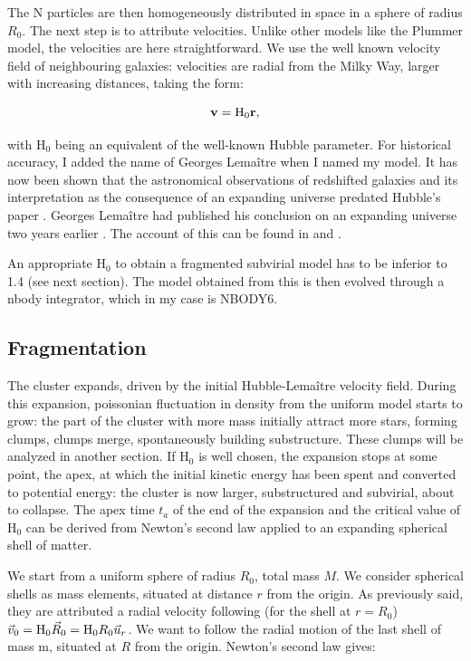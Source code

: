 The N particles are then homogeneously distributed in space in a sphere of radius $R_0$. The next step is to attribute velocities. Unlike other models like the Plummer model, the velocities are here straightforward. We use the well known velocity field of neighbouring galaxies: velocities are radial from the Milky Way, larger with increasing distances, taking the form:

\begin{equation}
\label{Eq:1_Hubble}
\bold{v} =  \textrm{H}_0 \bold{r},
\end{equation}

with H$_0$ being an equivalent of the well-known Hubble parameter. For historical accuracy, I added the name of Georges Lema\^itre when I named my model. It has now been shown that the astronomical observations of redshifted galaxies and its interpretation as the consequence of an expanding universe predated Hubble's paper \citep{Hubble1929}. Georges Lema\^itre had published his conclusion on an expanding universe two years earlier \citep{Lemaitre1927}. The account of this can be found in \cite{Kragh2003,VanDenBergh2011} and \cite{Freeman2015}.

An appropriate H$_0$ to obtain a fragmented subvirial model has to be inferior to 1.4 (see next section). The model obtained from this is then evolved through a nbody integrator, which in my case is NBODY6.


\subsection{Fragmentation}

The cluster expands, driven by the initial Hubble-Lema\^itre velocity field. During this expansion, poissonian fluctuation in density from the uniform model starts to grow: the part of the cluster with more mass initially attract more stars, forming clumps, clumps merge, spontaneously building substructure. These clumps will be analyzed in another section. If H$_0$ is well chosen, the expansion stops at some point, the apex, at which the initial kinetic energy has been spent and converted to potential energy: the cluster is now larger, substructured and subvirial, about to collapse. The apex time $t_a$ of the end of the expansion and the critical value of H$_0$ can be derived from Newton's second law applied to an expanding spherical shell of matter.

We start from a uniform sphere of radius $R_0$, total mass $M$. We consider spherical shells as mass elements, situated at distance $r$ from the origin. As previously said, they are attributed a radial velocity following (for the shell at $r=R_0$) $\vec v_0 = {\textrm{H}}_0 \vec R_0 = {\textrm{H}}_0 R_0 \vec u_r$. We want to follow the radial motion of the last shell of mass m, situated at $R$ from the origin. Newton's second law gives:


